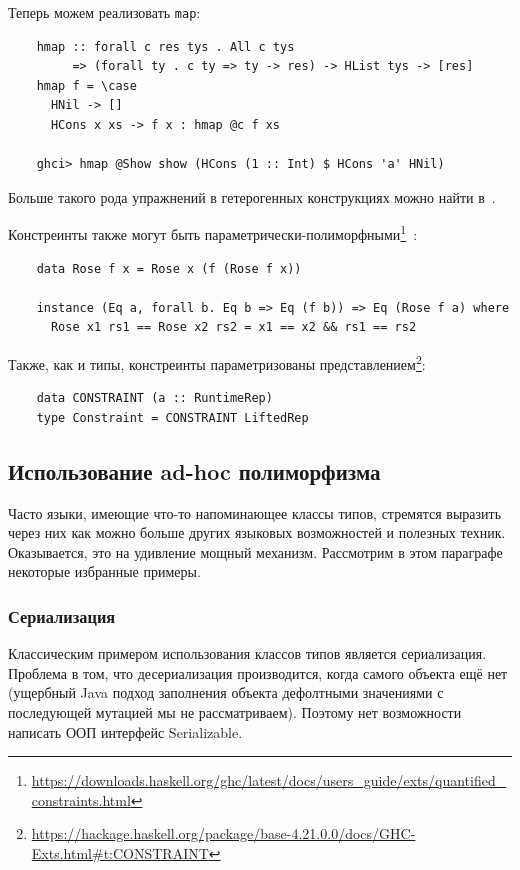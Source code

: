 Теперь можем реализовать \texttt{map}:
\begin{verbatim}
    hmap :: forall c res tys . All c tys
         => (forall ty . c ty => ty -> res) -> HList tys -> [res]
    hmap f = \case
      HNil -> []
      HCons x xs -> f x : hmap @c f xs

    ghci> hmap @Show show (HCons (1 :: Int) $ HCons 'a' HNil)
\end{verbatim}

Больше такого рода упражнений в гетерогенных конструкциях можно найти в~\cite{de2014true}.

Констреинты также могут быть параметрически-полиморфными\footnote{\url{https://downloads.haskell.org/ghc/latest/docs/users_guide/exts/quantified_constraints.html}}~\cite{bottu2017quantified}:
\begin{verbatim}
    data Rose f x = Rose x (f (Rose f x))

    instance (Eq a, forall b. Eq b => Eq (f b)) => Eq (Rose f a) where
      Rose x1 rs1 == Rose x2 rs2 = x1 == x2 && rs1 == rs2
\end{verbatim}

Также, как и типы, констреинты параметризованы представлением\footnote{\url{https://hackage.haskell.org/package/base-4.21.0.0/docs/GHC-Exts.html\#t:CONSTRAINT}}:
\begin{verbatim}
    data CONSTRAINT (a :: RuntimeRep)
    type Constraint = CONSTRAINT LiftedRep
\end{verbatim}

\subsection{Использование ad-hoc полиморфизма}

Часто языки, имеющие что-то напоминающее классы типов, стремятся выразить через них как можно больше других языковых возможностей и полезных техник.
Оказывается, это на удивление мощный механизм.
Рассмотрим в этом параграфе некоторые избранные примеры.

\subsubsection{Сериализация}

Классическим примером использования классов типов является сериализация.
Проблема в том, что десериализация производится, когда самого объекта ещё нет (ущербный Java подход заполнения объекта дефолтными значениями с последующей мутацией мы не рассматриваем).
Поэтому нет возможности написать ООП интерфейс Serializable.

